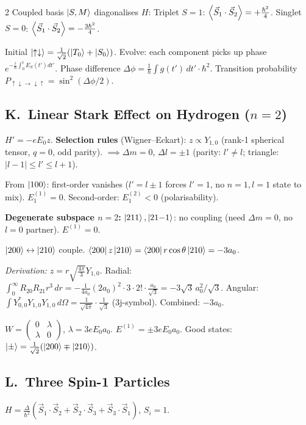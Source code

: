 \documentclass[9pt,a4paper]{article} %
\begin{document}
\begin{multicols}{2}
Coupled basis $\ket{S,M}$ diagonalises $H$:
Triplet $S=1$: $\ev{\vec{S}_1\cdot\vec{S}_2}=+\frac{\hbar^2}{4}$.
Singlet $S=0$: $\ev{\vec{S}_1\cdot\vec{S}_2}=-\frac{3\hbar^2}{4}$.

Initial $\ket{\uparrow\downarrow}=\frac{1}{\sqrt{2}}(\ket{T_0}+\ket{S_0})$.
Evolve: each component picks up phase $e^{-\frac{i}{\hbar}\int_0^t E_S(t')dt'}$.
Phase difference $\Delta\phi=\frac{1}{\hbar}\int g(t')\,dt'\cdot\hbar^2$.
Transition probability $P_{\uparrow\downarrow\to\downarrow\uparrow}=\sin^2(\Delta\phi/2)$.

\subsection{K.\ Linear Stark Effect on Hydrogen ($n=2$)}
$H'=-eE_0 z$.\; \textbf{Selection rules} (Wigner--Eckart):
$z\propto Y_{1,0}$ (rank-1 spherical tensor, $q=0$, odd parity).
$\implies\Delta m=0$,\; $\Delta l=\pm 1$ (parity: $l'\ne l$; triangle: $|l-1|\le l'\le l+1$).

From $\ket{100}$: first-order vanishes ($l'=l\pm 1$ forces $l'=1$, no $n=1,l=1$ state to mix).
$E_1^{(1)}=0$.\; Second-order: $E_1^{(2)}<0$ (polarisability).

\textbf{Degenerate subspace $n=2$:}
$\ket{211},\ket{21{-}1}$: no coupling (need $\Delta m=0$, no $l=0$ partner). $E^{(1)}=0$.

$\ket{200}\leftrightarrow\ket{210}$ couple.
$\bra{200}z\ket{210}=\bra{200}r\cos\theta\ket{210}=-3a_0$.

\textit{Derivation:} $z=r\sqrt{\frac{4\pi}{3}}Y_{1,0}$. Radial: $\int_0^\infty R_{20}R_{21}r^3\,dr = -\frac{1}{4a_0}(2a_0)^2\cdot 3\cdot 2!\cdot\frac{a_0}{\sqrt{3}}=-3\sqrt{3}\,a_0^2/\sqrt{3}$.\;
Angular: $\int Y_{0,0}^*Y_{1,0}Y_{1,0}\,d\Omega=\frac{1}{\sqrt{4\pi}}\cdot\frac{1}{\sqrt{3}}$ (3j-symbol). Combined: $-3a_0$.

$W=\begin{pmatrix}0&\lambda\\\lambda&0\end{pmatrix}$,\; $\lambda=3eE_0 a_0$.
$\boxed{E^{(1)}=\pm 3eE_0 a_0}$.\;
Good states: $\ket{\pm}=\frac{1}{\sqrt{2}}(\ket{200}\mp\ket{210})$.

\subsection{L.\ Three Spin-1 Particles}
$H=\frac{\Delta}{\hbar^2}(\vec{S}_1\!\cdot\!\vec{S}_2+\vec{S}_2\!\cdot\!\vec{S}_3+\vec{S}_3\!\cdot\!\vec{S}_1)$,\; $S_i=1$.


\end{multicols}
\end{document}

